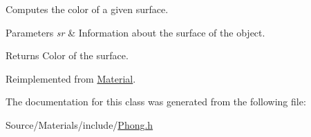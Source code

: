 Computes the color of a given surface. 
\begin{DoxyParams}{Parameters}
{\em sr} & Information about the surface of the object. \\
\hline
\end{DoxyParams}
\begin{DoxyReturn}{Returns}
Color of the surface. 
\end{DoxyReturn}


Reimplemented from \hyperlink{class_material_aeccd880ee7b86a849e8f2d2f0bcf4fc7}{Material}.



The documentation for this class was generated from the following file\+:\begin{DoxyCompactItemize}
\item 
Source/\+Materials/include/\hyperlink{_phong_8h}{Phong.\+h}\end{DoxyCompactItemize}
